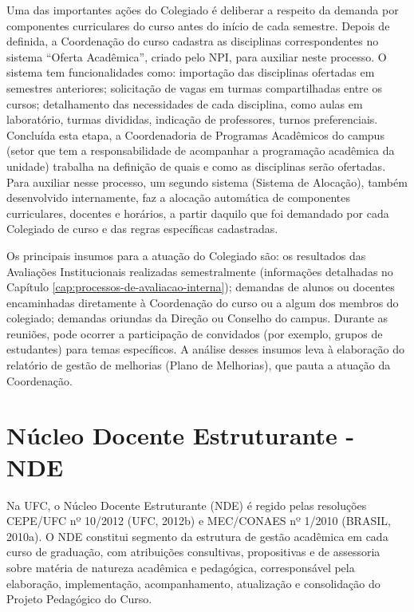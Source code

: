 Uma das importantes ações do Colegiado é deliberar a respeito da demanda por componentes curriculares do curso antes do início de cada semestre. Depois de definida, a Coordenação do curso cadastra as disciplinas correspondentes no sistema ``Oferta Acadêmica'', criado pelo NPI, para auxiliar neste processo. O sistema tem funcionalidades como: importação das disciplinas ofertadas em semestres anteriores; solicitação de vagas em turmas compartilhadas entre os cursos; detalhamento das necessidades de cada disciplina, como aulas em laboratório, turmas divididas, indicação de professores, turnos preferenciais. Concluída esta etapa, a Coordenadoria de Programas Acadêmicos do campus (setor que tem a responsabilidade de acompanhar a programação acadêmica da unidade) trabalha na definição de quais e como as disciplinas serão ofertadas. Para auxiliar nesse processo, um segundo sistema (Sistema de Alocação), também desenvolvido internamente, faz a alocação automática de componentes curriculares, docentes e horários, a partir daquilo que foi demandado por cada Colegiado de curso e das regras específicas cadastradas.

Os principais insumos para a atuação do Colegiado são: os resultados das Avaliações Institucionais realizadas semestralmente (informações detalhadas no Capítulo \ref{cap:processos-de-avaliacao-interna}); demandas de alunos ou docentes encaminhadas diretamente à Coordenação do curso ou a algum dos membros do colegiado; demandas oriundas da Direção ou Conselho do campus. Durante as reuniões, pode ocorrer a participação de convidados (por exemplo, grupos de estudantes) para temas específicos. A análise desses insumos leva à elaboração do relatório de gestão de melhorias (Plano de Melhorias), que pauta a atuação da Coordenação.

\section{Núcleo Docente Estruturante - NDE}
\label{sec:NDE}

Na UFC, o Núcleo Docente Estruturante (NDE) é regido pelas resoluções CEPE/UFC nº 10/2012 (UFC, 2012b) e MEC/CONAES nº 1/2010 (BRASIL, 2010a). O NDE constitui segmento da estrutura de gestão acadêmica em cada curso de graduação, com atribuições consultivas, propositivas e de assessoria sobre matéria de natureza acadêmica e pedagógica, corresponsável pela elaboração, implementação, acompanhamento, atualização e consolidação do Projeto Pedagógico do Curso.

